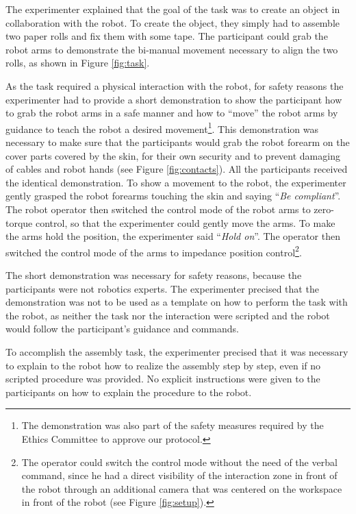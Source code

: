 \documentclass[twocolumn]{svjour3}          %
\begin{document}
The experimenter explained that the goal of the task was to create an object in collaboration with the robot.
To create the object, they simply had to assemble two paper rolls and fix them with some tape.
The participant could grab the robot arms to demonstrate the bi-manual movement necessary to align the two rolls, as shown in Figure \ref{fig:task}. 

As the task required a physical interaction with the robot, for safety reasons the experimenter had to provide a short demonstration to show the participant how to grab the robot arms in a safe manner and how to ``move'' the robot arms by guidance to teach the robot a desired movement\footnote{The demonstration was also part of the safety measures required by the Ethics Committee to approve our protocol.}.
This demonstration was necessary to make sure that the participants would grab the robot forearm on the cover parts covered by the skin, for their own security and to prevent damaging of cables and robot hands (see Figure \ref{fig:contacts}).
All the participants received the identical demonstration. 
To show a movement to the robot, the experimenter gently grasped the robot forearms touching the skin and saying ``\textit{Be compliant}''. The robot operator then switched the control mode of the robot arms to zero-torque control, so that the experimenter could gently move the arms. To make the arms hold the position, the experimenter said ``\textit{Hold on}''. The operator then switched the control mode of the arms to impedance position control\footnote{The operator could switch the control mode without the need of the verbal command, since he had a direct visibility of the interaction zone in front of the robot through an additional camera that was centered on the workspace in front of the robot (see Figure \ref{fig:setup}).}. 

The short demonstration was necessary for safety reasons, because the participants were not robotics experts.
The experimenter precised that the demonstration was not to be used as a template on how to perform the task with the robot, as neither the task nor the interaction were scripted and the robot would follow the participant's guidance and commands. 


To accomplish the assembly task, the experimenter precised that it was necessary to explain  to the robot how to realize the assembly step by step, even if no scripted procedure was provided. No explicit instructions were given to the participants on how to explain the procedure to the robot.
\end{document}
